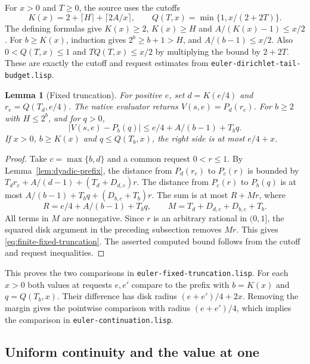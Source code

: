 \documentclass[11pt]{amsart}
\newtheorem{lemma}[theorem]{Lemma}
\theoremstyle{definition}
\theoremstyle{remark}
\numberwithin{equation}{section}
\newcommand{\code}[1]{\nolinkurl{#1}}
\begin{document}
For $x>0$ and $T\ge0$, the source uses the cutoffs
\[
 K(x)=2+\lceil H\rceil+\lceil 2A/x\rceil,\qquad
 Q(T,x)=\min\{1,x/(2+2T)\}.
\]
The defining formulas give $K(x)\ge2$, $K(x)\ge H$ and
$A/(K(x)-1)\le x/2$. For $b\ge K(x)$, induction gives
$2^b\ge b+1>H$, and $A/(b-1)\le x/2$.
Also $0<Q(T,x)\le1$ and $TQ(T,x)\le x/2$ by multiplying
the bound by $2+2T$. These are exactly the cutoff and request
estimates from \code{euler-dirichlet-tail-budget.lisp}.

\begin{lemma}[Fixed truncation]
\label{lem:fixed-truncation}
For positive $e$, set $d=K(e/4)$ and $r_e=Q(T_d,e/4)$.
The native evaluator returns $V(s,e)=P_d(r_e)$.
For $b\ge2$ with $H\le2^b$, and for $q>0$,
\begin{equation}\label{eq:finite-fixed-truncation}
 |V(s,e)-P_b(q)| \le e/4+A/(b-1)+T_bq .
\end{equation}
If $x>0$, $b\ge K(x)$ and $q\le Q(T_b,x)$, the right side
is at most $e/4+x$.
\end{lemma}
\begin{proof}
Take $c=\max\{b,d\}$ and a common request $0<r\le1$.
By Lemma~\ref{lem:dyadic-prefix}, the distance from
$P_d(r_e)$ to $P_c(r)$ is bounded by
$T_dr_e+A/(d-1)+(T_d+D_{d,c})r$.
The distance from $P_c(r)$ to $P_b(q)$ is at most
$A/(b-1)+T_bq+(D_{b,c}+T_b)r$.
The sum is at most $R+Mr$, where
\[
 R=e/4+A/(b-1)+T_bq,\qquad
 M=T_d+D_{d,c}+D_{b,c}+T_b.
\]
All terms in $M$ are nonnegative. Since $r$ is an arbitrary
rational in $(0,1]$, the squared disk argument in the preceding
subsection removes $Mr$. This gives
\eqref{eq:finite-fixed-truncation}. The asserted computed bound
follows from the cutoff and request inequalities.
\end{proof}

This proves the two comparisons in
\code{euler-fixed-truncation.lisp}. For each $x>0$ both values
at requests $e,e'$ compare to the prefix with $b=K(x)$ and
$q=Q(T_b,x)$. Their difference has disk radius
$(e+e')/4+2x$. Removing the margin gives the pointwise
comparison with radius $(e+e')/4$, which implies the comparison
in \code{euler-continuation.lisp}.

\subsection{Uniform continuity and the value at one}
\label{sec:native-at-one}
\end{document}
